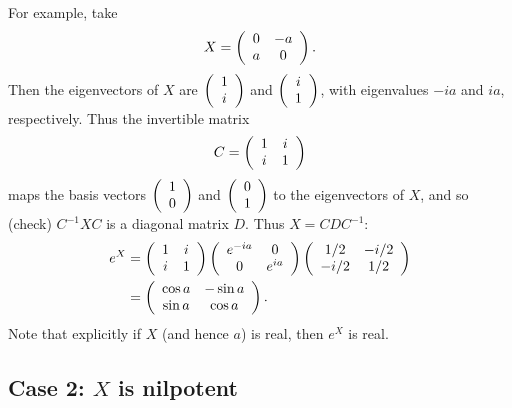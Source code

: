 \documentclass[12pt]{amsbook}
\theoremstyle{plain}
\numberwithin{equation}{chapter}
\numberwithin{theorem}{chapter}
\begin{document}
For example, take
\[
X=\left(
\begin{array}
[c]{cc}%
0 & -a\\
a & 0
\end{array}
\right)  \text{.}%
\]
Then the eigenvectors of $X$ are $\left(
\begin{array}
[c]{c}%
1\\
i
\end{array}
\right)  $ and $\left(
\begin{array}
[c]{c}%
i\\
1
\end{array}
\right)  $, with eigenvalues $-ia$ and $ia$, respectively. Thus the invertible
matrix
\[
C=\left(
\begin{array}
[c]{cc}%
1 & i\\
i & 1
\end{array}
\right)
\]
maps the basis vectors $\left(
\begin{array}
[c]{c}%
1\\
0
\end{array}
\right)  $ and $\left(
\begin{array}
[c]{c}%
0\\
1
\end{array}
\right)  $ to the eigenvectors of $X$, and so (check) $C^{-1}XC$ is a diagonal
matrix $D$. Thus $X=CDC^{-1}$:
\begin{align*}
e^{X}  & =\left(
\begin{array}
[c]{cc}%
1 & i\\
i & 1
\end{array}
\right)  \left(
\begin{array}
[c]{cc}%
e^{-ia} & 0\\
0 & e^{ia}%
\end{array}
\right)  \left(
\begin{array}
[c]{cc}%
1/2 & -i/2\\
-i/2 & 1/2
\end{array}
\right) \\
& =\left(
\begin{array}
[c]{cc}%
\cos a & -\sin a\\
\sin a & \cos a
\end{array}
\right)  \text{.}%
\end{align*}
Note that explicitly if $X$ (and hence $a$) is real, then $e^{X}$ is real.

\subsection{Case 2: $X$ is nilpotent}
\end{document}
